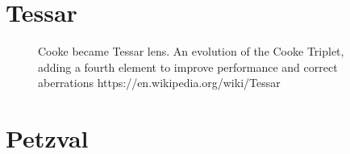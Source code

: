 \documentclass[
  letterpaper,
]{book}
\begin{document}
\chapter{Tessar}

\begin{figure}


\caption{\label{fig-optics-notransverse}Cooke became Tessar lens. An
evolution of the Cooke Triplet, adding a fourth element to improve
performance and correct aberrations
https://en.wikipedia.org/wiki/Tessar}

\end{figure}%

\chapter{Petzval}
\end{document}
